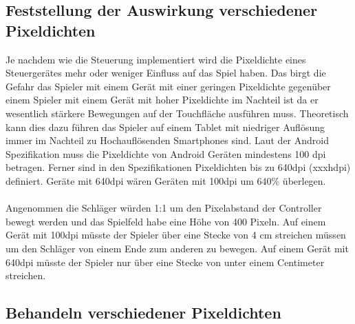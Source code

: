 \subsection{Feststellung der Auswirkung verschiedener Pixeldichten}
Je nachdem wie die Steuerung implementiert wird die Pixeldichte eines Steuergerätes mehr oder weniger Einfluss auf das Spiel haben. Das birgt die Gefahr das Spieler mit einem Gerät mit einer geringen Pixeldichte gegenüber einem Spieler mit einem Gerät mit hoher Pixeldichte im Nachteil ist da er wesentlich stärkere Bewegungen auf der Touchfläche ausführen muss.
Theoretisch kann dies dazu führen das Spieler auf einem Tablet mit niedriger Auflösung immer im Nachteil zu Hochauflösenden Smartphones sind.
Laut der Android Spezifikation muss die Pixeldichte von Android Geräten mindestens 100 dpi betragen. Ferner sind in den Spezifikationen Pixeldichten bis zu 640dpi (xxxhdpi) definiert. Geräte mit 640dpi wären Geräten mit 100dpi um 640\% überlegen.
\paragraph{} Angenommen die Schläger würden 1:1 um den Pixelabstand der Controller bewegt werden und das Spielfeld habe eine Höhe von 400 Pixeln.
Auf einem Gerät mit 100dpi müsste der Spieler über eine Stecke von 4 cm streichen müssen um den Schläger von einem Ende zum anderen zu bewegen. Auf einem Gerät mit 640dpi müsste der Spieler nur über eine Stecke von unter einem Centimeter streichen.
\subsection{Behandeln verschiedener Pixeldichten}
